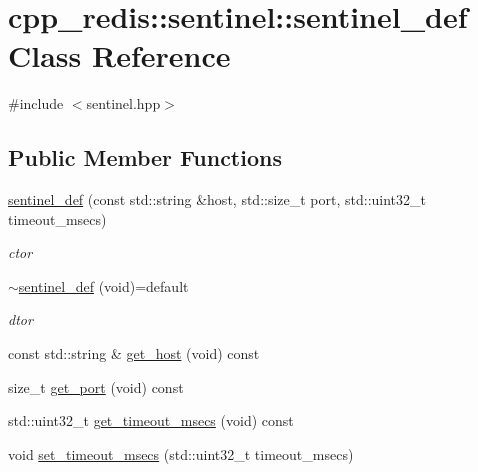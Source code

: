 \hypertarget{classcpp__redis_1_1sentinel_1_1sentinel__def}{}\section{cpp\+\_\+redis\+:\+:sentinel\+:\+:sentinel\+\_\+def Class Reference}
\label{classcpp__redis_1_1sentinel_1_1sentinel__def}


{\ttfamily \#include $<$sentinel.\+hpp$>$}

\subsection*{Public Member Functions}
\begin{DoxyCompactItemize}
\item 
\mbox{\label{classcpp__redis_1_1sentinel_1_1sentinel__def_a2d3116ce99ba2bd8c320ccc85901e5a1}} 
\mbox{\hyperlink{classcpp__redis_1_1sentinel_1_1sentinel__def_a2d3116ce99ba2bd8c320ccc85901e5a1}{sentinel\+\_\+def}} (const std\+::string \&host, std\+::size\+\_\+t port, std\+::uint32\+\_\+t timeout\+\_\+msecs)
\begin{DoxyCompactList}\small\item\em ctor \end{DoxyCompactList}\item 
\mbox{\label{classcpp__redis_1_1sentinel_1_1sentinel__def_a5189d8016d9b385099e5ee0828ed7666}} 
\mbox{\hyperlink{classcpp__redis_1_1sentinel_1_1sentinel__def_a5189d8016d9b385099e5ee0828ed7666}{$\sim$sentinel\+\_\+def}} (void)=default
\begin{DoxyCompactList}\small\item\em dtor \end{DoxyCompactList}\item 
const std\+::string \& \mbox{\hyperlink{classcpp__redis_1_1sentinel_1_1sentinel__def_af61b33ea2b5154735e4b804039771f19}{get\+\_\+host}} (void) const
\item 
size\+\_\+t \mbox{\hyperlink{classcpp__redis_1_1sentinel_1_1sentinel__def_a1994bec14cc8703d1198de96b66a0f30}{get\+\_\+port}} (void) const
\item 
std\+::uint32\+\_\+t \mbox{\hyperlink{classcpp__redis_1_1sentinel_1_1sentinel__def_af7aa53bdf7bd56becdad9205e82949c5}{get\+\_\+timeout\+\_\+msecs}} (void) const
\item 
void \mbox{\hyperlink{classcpp__redis_1_1sentinel_1_1sentinel__def_abc234e6c289f7b3d95868ae32343ff92}{set\+\_\+timeout\+\_\+msecs}} (std\+::uint32\+\_\+t timeout\+\_\+msecs)
\end{DoxyCompactItemize}


